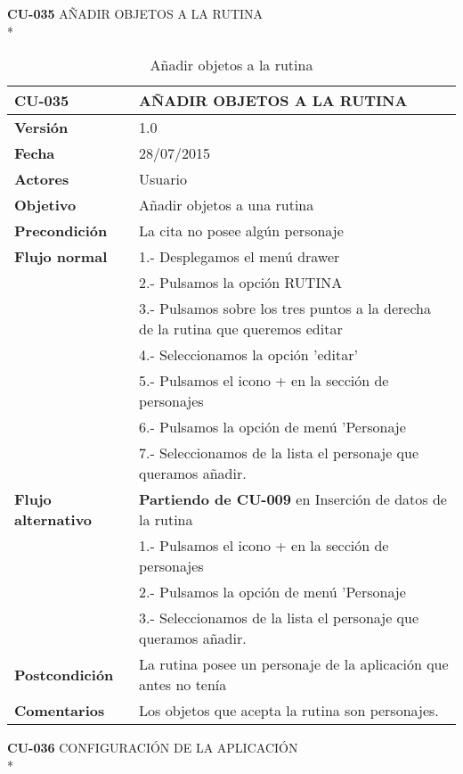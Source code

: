 \documentclass[../pfc.tex]{subfiles}
\begin{document}
	\textbf{CU-035}	AÑADIR OBJETOS A LA RUTINA\\*

	\begin{table}[H]
		\centering
		\begin{tabular}[t]{|p{3cm}|p{9.5cm}|}
			\hline \textbf{CU-035} & \textbf{AÑADIR OBJETOS A LA RUTINA}\\*
			\hline\hline \textbf{Versión} & 1.0 \\*
			\hline\hline \textbf{Fecha} & 28/07/2015 \\*
			\hline\textbf{Actores} 	& Usuario\\*
			\hline \textbf{Objetivo} & Añadir objetos a una rutina\\* 			
			\hline \textbf{Precondición} & La cita no posee algún personaje\\* 
			\hline \textbf{Flujo normal} & 1.- Desplegamos el menú drawer \\* 
			& 2.- Pulsamos la opción RUTINA\\*	
			& 3.- Pulsamos sobre los tres puntos a la derecha de la rutina que queremos editar\\*	
			& 4.- Seleccionamos la opción 'editar'\\*	
			& 5.- Pulsamos el icono + en la sección de personajes\\*
			& 6.- Pulsamos la opción de menú 'Personaje\\*
			& 7.- Seleccionamos de la lista el personaje que queramos añadir.\\*
			\hline \textbf{Flujo alternativo} & \textbf{Partiendo de CU-009} en Inserción de datos de la rutina\\*  
			& 1.- Pulsamos el icono + en la sección de personajes\\*
			& 2.- Pulsamos la opción de menú 'Personaje\\*
			& 3.- Seleccionamos de la lista el personaje que queramos añadir.\\*
			\hline \textbf{Postcondición} & La rutina posee un personaje de la aplicación que antes no tenía\\* 
			\hline \textbf{Comentarios}   & Los objetos que acepta la rutina son personajes.\\*
			\hline
		\end{tabular}
		\caption{Añadir objetos a la rutina}
		\label{tabla:caso035}
	\end{table}
	
	
	\textbf{CU-036}	CONFIGURACIÓN DE LA APLICACIÓN\\*
\end{document}
